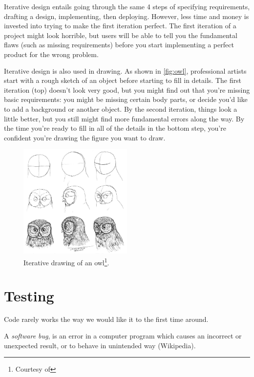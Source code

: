 Iterative design entails going through the same 4 steps of specifying requirements, drafting a design, implementing, then deploying. However, less time and money is invested into trying to make the first iteration perfect. The first iteration of a project might look horrible, but users will be able to tell you the fundamental flaws (such as missing requirements) before you start implementing a perfect product for the wrong problem. 

Iterative design is also used in drawing. As shown in \autoref{fig:owl}, professional artists start with a rough sketch of an object before starting to fill in details. The first iteration (top) doesn't look very good, but you might find out that you're missing basic requirements: you might be missing certain body parts, or decide you'd like to add a background or another object. By the second iteration, things look a little better, but you still might find more fundamental errors along the way. By the time you're ready to fill in all of the details in the bottom step, you're confident you're drawing the figure you want to draw. 

\begin{figure}
	\centering
	\includegraphics[width=0.5\textwidth]{images/owl.jpg}
	\caption[Iterative drawing of an owl]{Iterative drawing of an owl\footnote{Courtesy of %
	}.}
	\label{fig:owl}
\end{figure}

\section{Testing}
Code rarely works the way we would like it to the first time around. 

\begin{definition}
A \emph{software bug}, is an error in a computer program which causes an incorrect or unexpected result, or to behave in unintended way (Wikipedia). 
\end{definition} 

